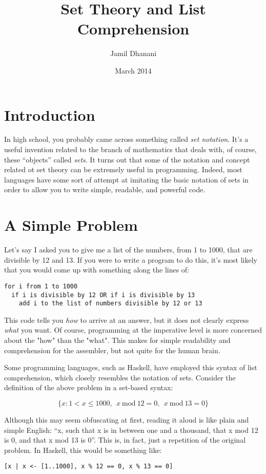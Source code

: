 \documentclass{article}
\title{Set Theory and List Comprehension}
\author{Jamil Dhanani}
\date{March 2014}
\begin{document}
\maketitle

\section{Introduction}
In high school, you probably came across something called \textit{set notation}. It's a useful invention related to the branch of mathematics that deals with, of course, these ``objects'' called \textit{sets}. It turns out that some of the notation and concept related ot set theory can be extremely useful in programming. Indeed, most languages have some sort of attempt at imitating the basic notation of sets in order to allow you to write simple, readable, and powerful code.

\section{A Simple Problem}
Let's say I asked you to give me a list of the numbers, from 1 to 1000, that are divisible by 12 and 13. If you were to write a program to do this, it's most likely that you would come up with something along the lines of:

\begin{verbatim}
for i from 1 to 1000
  if i is divisible by 12 OR if i is divisible by 13
    add i to the list of numbers divisible by 12 or 13
\end{verbatim}

This code tells you \textit{how} to arrive at an answer, but it does not clearly express \textit{what} you want. Of course, programming at the imperative level is more concerned about the "how" than the "what". This makes for simple readability and comprehension for the assembler, but not quite for the human brain.

Some programming languages, such as Haskell, have employed this syntax of list comprehension, which closely resembles the notation of sets. Consider the definition of the above problem in a set-based syntax:

\begin{equation}
\{x : 1 < x \leq 1000,\>\> x \> \mathrm{mod} \> 12 = 0,\>\> x \> \mathrm{mod} \> 13 = 0\}
\end{equation}

Although this may seem obfuscating at first, reading it aloud is like plain and simple English: ``x, such that x is in between one and a thousand, that x mod 12 is 0, and that x mod 13 is 0''. This is, in fact, just a repetition of the original problem. In Haskell, this would be something like:

\begin{verbatim}
[x | x <- [1..1000], x % 12 == 0, x % 13 == 0] 
\end{verbatim}
\end{document}
